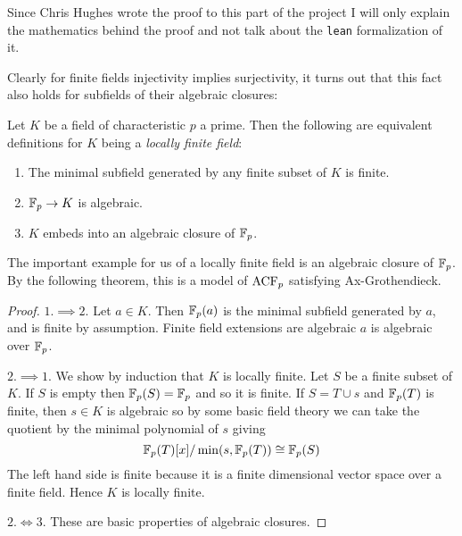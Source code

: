 Since Chris Hughes wrote the proof to this part of the project
I will only explain the mathematics behind the proof and not
talk about the \texttt{lean} formalization of it.

Clearly for finite fields injectivity implies surjectivity,
it turns out that this fact also holds for subfields of their algebraic closures:

\begin{dfn}
    Let $K$ be a field of characteristic $p$ a prime.
    Then the following are equivalent definitions for $K$ being a
    \textit{locally finite field}:
    \begin{enumerate}
        \item The minimal subfield generated by any finite subset of $K$ is finite.
        \item $\mathbb{F}_p \to K$ is algebraic.
        \item $K$ embeds into an algebraic closure of $\mathbb{F}_p$.
    \end{enumerate}
    The important example for us of a locally finite field is an algebraic closure of $\mathbb{F}_{p}$.
    By the following theorem, this is a model of $\operatorname{ACF}_{p}$ satisfying Ax-Grothendieck.
\end{dfn}
\begin{proof}
  $1.\implies 2.$
  Let $a \in K$. Then $\mathbb{F}_{p}(a)$ is the minimal subfield generated by $a$,
  and is finite by assumption.
  Finite field extensions are algebraic $a$ is algebraic over $\mathbb{F}_{p}$.

  $2. \implies 1.$ We show by induction that $K$ is locally finite.
  Let $S$ be a finite subset of $K$.
  If $S$ is empty then $\mathbb{F}_p(S) = \mathbb{F}_p$ and so it is finite.
  If $S = T \cup {s}$ and $\mathbb{F}_p(T)$ is finite,
  then $s \in K$ is algebraic so by some basic field theory we can
  take the quotient by the minimal polynomial of $s$ giving
  \[\mathbb{F}_p(T)[x] / \min (s, \mathbb{F}_p(T)) \cong \mathbb{F}_p(S)\]
  The left hand side is finite because it is a finite
  dimensional vector space over a finite field.
  Hence $K$ is locally finite.

  $2. \iff 3.$ These are basic properties of algebraic closures.
\end{proof}

